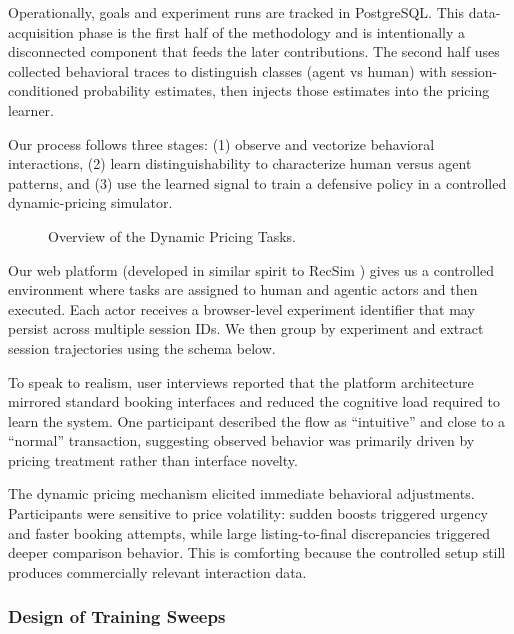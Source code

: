 Operationally, goals and experiment runs are tracked in PostgreSQL. This data-acquisition phase is the first half of the methodology and is intentionally a disconnected component that feeds the later contributions. The second half uses collected behavioral traces to distinguish classes (agent vs human) with session-conditioned probability estimates, then injects those estimates into the pricing learner.

Our process follows three stages: (1) observe and vectorize behavioral interactions, (2) learn distinguishability to characterize human versus agent patterns, and (3) use the learned signal to train a defensive policy in a controlled dynamic-pricing simulator.

\begin{figure}[ht]
  \resizebox{\columnwidth}{!}{%
    
  }
  \caption{Overview of the Dynamic Pricing Tasks.}
\end{figure}

Our web platform (developed in similar spirit to RecSim \parencite{ie_recsim_2019}) gives us a controlled environment where tasks are assigned to human and agentic actors and then executed. Each actor receives a browser-level experiment identifier that may persist across multiple session IDs. We then group by experiment and extract session trajectories using the schema below.

To speak to realism, user interviews reported that the platform architecture mirrored standard booking interfaces and reduced the cognitive load required to learn the system. One participant described the flow as ``intuitive'' and close to a ``normal'' transaction, suggesting observed behavior was primarily driven by pricing treatment rather than interface novelty.

The dynamic pricing mechanism elicited immediate behavioral adjustments. Participants were sensitive to price volatility: sudden boosts triggered urgency and faster booking attempts, while large listing-to-final discrepancies triggered deeper comparison behavior. This is comforting because the controlled setup still produces commercially relevant interaction data.

\subsubsection{Design of Training Sweeps}

